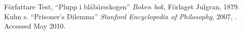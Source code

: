\begin{thebibliography}{99}
 Författare Test, ``Plupp i blåbärsskogen'' \textit{Boken bok}, Förlaget Julgran, 1879.
 Kuhn s. ``Prisoner's Dilemma'' \textit{Stanford Encyclopedia of Philosophy}, 2007, . Accessed May 2010. 
\end{thebibliography}
